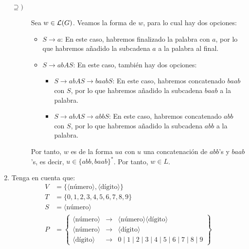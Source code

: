 \begin{ejercicio}
\begin{enumerate}
\begin{description}
            \item[$\supseteq)$] Sea $w\in\mathcal{L}(G)$. Veamos la forma de $w$, para lo cual hay dos opciones:
            \begin{itemize}
                \item $S\rightarrow a$: En este caso, habremos finalizado la palabra con $a$, por lo que habremos añadido la subcadena $a$ a la palabra al final.
                \item $S \rightarrow abAS$: En este caso, también hay dos opciones:
                \begin{itemize}
                    \item $S \rightarrow abAS \rightarrow baabS$: En este caso, habremos concatenado $baab$ con $S$, por lo que habremos añadido la subcadena $baab$ a la palabra.
                    \item $S \rightarrow abAS \rightarrow abbS$: En este caso, habremos concatenado $abb$ con $S$, por lo que habremos añadido la subcadena $abb$ a la palabra.
                \end{itemize}
            \end{itemize}
            Por tanto, $w$ es de la forma $ua$ con $u$ una concatenación de $abb$'s y $baab$'s, es decir, $u\in\{abb, baab\}^\ast$.
            Por tanto, $w\in L$.
        \end{description}

        \item \label{ej:1.2.b} Tenga en cuenta que:
        \begin{align*}
            V &= \{\langle \text{número} \rangle, \langle \text{dígito} \rangle\} \\
            T &= \{0,1,2,3,4,5,6,7,8,9\} \\
            S &= \langle \text{número} \rangle \\
            P &= \left\{
                \begin{array}{rcl}
                    \langle \text{número} \rangle &\rightarrow & \langle \text{número} \rangle \langle \text{dígito} \rangle \\
                    \langle \text{número} \rangle &\rightarrow & \langle \text{dígito} \rangle \\
                    \langle \text{dígito} \rangle &\rightarrow & 0 \mid 1 \mid 2 \mid 3 \mid 4 \mid 5 \mid 6 \mid 7 \mid 8 \mid 9
                \end{array}
            \right\}
        \end{align*}


\end{enumerate}
\end{ejercicio}
